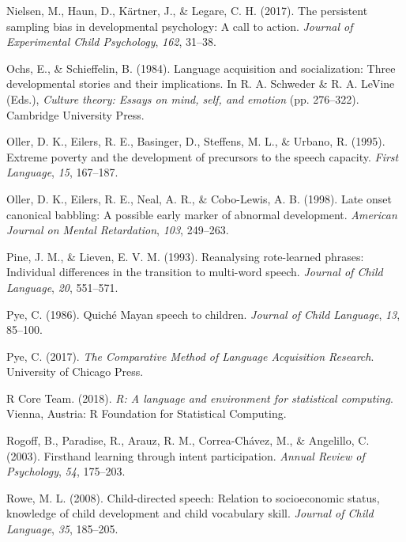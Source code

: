 \documentclass[floatsintext,man]{apa6}
\theoremstyle{definition}
\theoremstyle{definition}
\theoremstyle{definition}
\theoremstyle{remark}
\begin{document}
\hypertarget{ref-nielsen2017persistent}{}
Nielsen, M., Haun, D., Kärtner, J., \& Legare, C. H. (2017). The
persistent sampling bias in developmental psychology: A call to action.
\emph{Journal of Experimental Child Psychology}, \emph{162}, 31--38.

\hypertarget{ref-ochs1984language}{}
Ochs, E., \& Schieffelin, B. (1984). Language acquisition and
socialization: Three developmental stories and their implications. In R.
A. Schweder \& R. A. LeVine (Eds.), \emph{Culture theory: Essays on
mind, self, and emotion} (pp. 276--322). Cambridge University Press.

\hypertarget{ref-oller1995extreme}{}
Oller, D. K., Eilers, R. E., Basinger, D., Steffens, M. L., \& Urbano,
R. (1995). Extreme poverty and the development of precursors to the
speech capacity. \emph{First Language}, \emph{15}, 167--187.

\hypertarget{ref-oller1998late}{}
Oller, D. K., Eilers, R. E., Neal, A. R., \& Cobo-Lewis, A. B. (1998).
Late onset canonical babbling: A possible early marker of abnormal
development. \emph{American Journal on Mental Retardation}, \emph{103},
249--263.

\hypertarget{ref-pine1993reanalysing}{}
Pine, J. M., \& Lieven, E. V. M. (1993). Reanalysing rote-learned
phrases: Individual differences in the transition to multi-word speech.
\emph{Journal of Child Language}, \emph{20}, 551--571.

\hypertarget{ref-pye1986quiche}{}
Pye, C. (1986). Quiché Mayan speech to children. \emph{Journal of Child
Language}, \emph{13}, 85--100.

\hypertarget{ref-pye2017comparative}{}
Pye, C. (2017). \emph{The Comparative Method of Language Acquisition
Research}. University of Chicago Press.

\hypertarget{ref-R-base}{}
R Core Team. (2018). \emph{R: A language and environment for statistical
computing}. Vienna, Austria: R Foundation for Statistical Computing.

\hypertarget{ref-rogoff2003firsthand}{}
Rogoff, B., Paradise, R., Arauz, R. M., Correa-Chávez, M., \& Angelillo,
C. (2003). Firsthand learning through intent participation. \emph{Annual
Review of Psychology}, \emph{54}, 175--203.

\hypertarget{ref-rowe2008child}{}
Rowe, M. L. (2008). Child-directed speech: Relation to socioeconomic
status, knowledge of child development and child vocabulary skill.
\emph{Journal of Child Language}, \emph{35}, 185--205.
\end{document}
